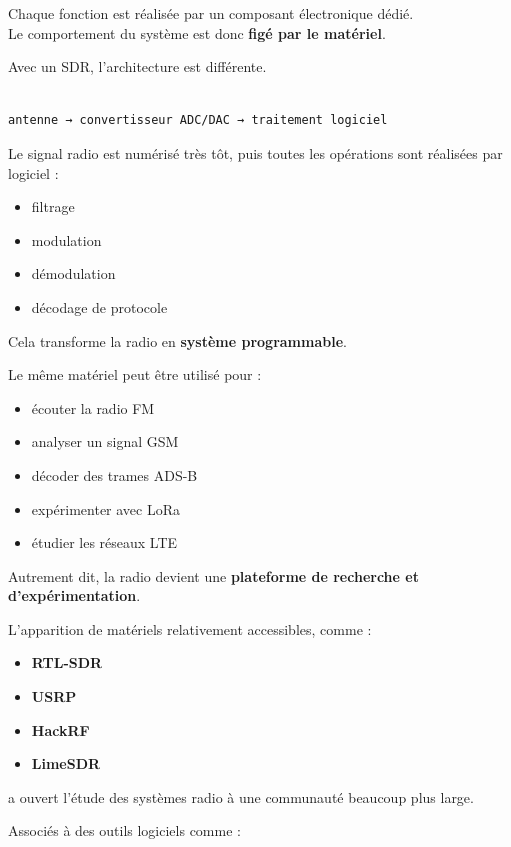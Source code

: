 \documentclass[
  french,
]{article}
\providecommand{\tightlist}{%
  \setlength{\itemsep}{0pt}\setlength{\parskip}{0pt}}
\begin{document}
Chaque fonction est réalisée par un composant électronique dédié.\\
Le comportement du système est donc \textbf{figé par le matériel}.

Avec un SDR, l'architecture est différente.

\begin{verbatim}

antenne → convertisseur ADC/DAC → traitement logiciel
\end{verbatim}

Le signal radio est numérisé très tôt, puis toutes les opérations sont
réalisées par logiciel :

\begin{itemize}
\tightlist
\item
  filtrage
\item
  modulation
\item
  démodulation
\item
  décodage de protocole
\end{itemize}

Cela transforme la radio en \textbf{système programmable}.

Le même matériel peut être utilisé pour :

\begin{itemize}
\tightlist
\item
  écouter la radio FM
\item
  analyser un signal GSM
\item
  décoder des trames ADS-B
\item
  expérimenter avec LoRa
\item
  étudier les réseaux LTE
\end{itemize}

Autrement dit, la radio devient une \textbf{plateforme de recherche et
d'expérimentation}.

L'apparition de matériels relativement accessibles, comme :

\begin{itemize}
\tightlist
\item
  \textbf{RTL-SDR}
\item
  \textbf{USRP}
\item
  \textbf{HackRF}
\item
  \textbf{LimeSDR}
\end{itemize}

a ouvert l'étude des systèmes radio à une communauté beaucoup plus
large.

Associés à des outils logiciels comme :
\end{document}
